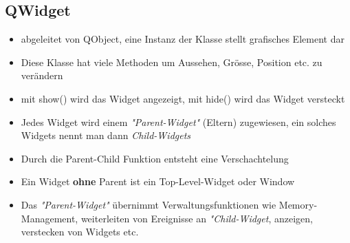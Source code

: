 \subsection{QWidget}
\begin{itemize}
	\item abgeleitet von QObject,  eine Instanz der Klasse stellt grafisches Element dar
	\item Diese Klasse hat viele Methoden um Aussehen, Grösse, Position etc. zu verändern
	\item mit show() wird das Widget angezeigt, mit hide() wird das Widget versteckt
	\item Jedes Widget wird einem \textit{"Parent-Widget"} (Eltern) zugewiesen, ein solches Widgets nennt man dann \textit{Child-Widgets}
	\item Durch die Parent-Child Funktion entsteht eine Verschachtelung
	\item Ein Widget \textbf{ohne} Parent ist ein Top-Level-Widget oder Window	
	\item Das \textit{"Parent-Widget"} übernimmt Verwaltungsfunktionen wie Memory-Management, \newline
    weiterleiten von Ereignisse an \textit{"Child-Widget}, anzeigen, verstecken von Widgets etc.
\end{itemize}

